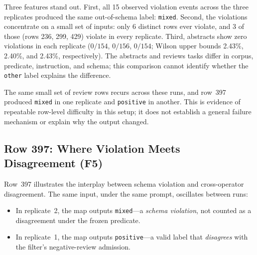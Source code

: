 \documentclass[11pt]{article}
\begin{document}
\begin{table}[t]
\centering
\caption{Schema violations per replicate (RQ2, reviews). Three replicates,
  hosted \texttt{gpt-4o-mini}. Wilson 95\% intervals. All
  violations produce the label \texttt{mixed}.}
\label{tab:rq2}
\smallskip
\small
{}
\end{table}

Three features stand out. First, all 15 observed violation events across the
three replicates produced the same out-of-schema label: \texttt{mixed}.
Second, the violations concentrate on a small set of inputs: only 6
distinct rows ever violate, and 3 of those (rows 236, 299, 429) violate
in every replicate. Third, abstracts show zero violations in each replicate
($0/154$, $0/156$, $0/154$; Wilson upper bounds 2.43\%, 2.40\%, and
2.43\%, respectively). The abstracts and reviews tasks differ in corpus,
predicate, instruction, and schema; this comparison cannot identify whether
the \texttt{other} label explains the difference.

The same small set of review rows recurs across these runs, and row~397
produced \texttt{mixed} in one replicate and \texttt{positive} in another.
This is evidence of repeatable row-level difficulty in this setup; it does
not establish a general failure mechanism or explain why the output changed.

\subsection{Row 397: Where Violation Meets Disagreement (F5)}

Row~397 illustrates the interplay between schema violation and
cross-operator disagreement.  The same input, under the same prompt,
oscillates between runs:

\begin{itemize}
\item In replicate~2, the map outputs \texttt{mixed}---a \emph{schema
  violation}, not counted as a disagreement under the frozen predicate.
\item In replicate~1, the map outputs \texttt{positive}---a valid label
  that \emph{disagrees} with the filter's negative-review admission.
\end{itemize}
\end{document}
